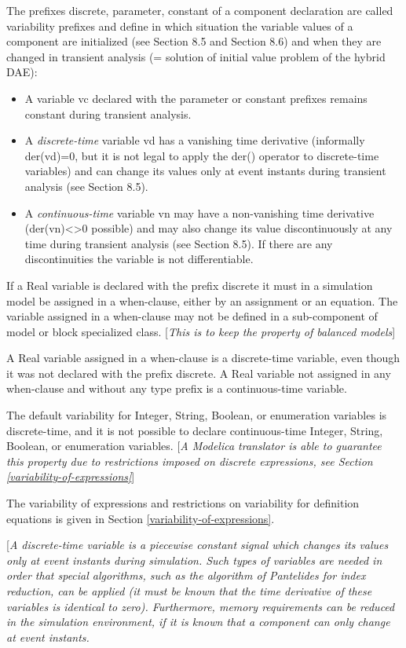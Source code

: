 \documentclass[10pt,a4paper]{report}
\def\Mcomment#1{{[}\emph{#1}{]}}
\def\Mcommentbegin#1{{[}\emph{#1}}
\begin{document}
The prefixes discrete, parameter, constant of a component declaration
are called variability prefixes and define in which situation the
variable values of a component are initialized (see Section 8.5 and
Section 8.6) and when they are changed in transient analysis (=
solution of initial value problem of the hybrid DAE):

\begin{itemize}
\item
  A variable vc declared with the parameter or constant prefixes remains
  constant during transient analysis.
\item
  A \emph{discrete-time} variable vd has a vanishing time derivative
  (informally der(vd)=0, but it is not legal to apply the der() operator
  to discrete-time variables) and can change its values only at event
  instants during transient analysis (see Section 8.5).
\item
  A \emph{continuous-time} variable vn may have a non-vanishing time
  derivative (der(vn)\textless{}\textgreater{}0 possible) and may also
  change its value discontinuously at any time during transient analysis
  (see Section 8.5). If there are any discontinuities the variable is
  not differentiable.
\end{itemize}

If a Real variable is declared with the prefix discrete it must in a
simulation model be assigned in a when-clause, either by an assignment
or an equation. The variable assigned in a when-clause may not be
defined in a sub-component of model or block specialized class.
\Mcomment{This is to keep the property of balanced models}

A Real variable assigned in a when-clause is a discrete-time variable,
even though it was not declared with the prefix discrete. A Real
variable not assigned in any when-clause and without any type prefix is
a continuous-time variable.

The default variability for Integer, String, Boolean, or enumeration
variables is discrete-time, and it is not possible to declare
continuous-time Integer, String, Boolean, or enumeration variables.
\Mcomment{A Modelica translator is able to guarantee this property due to
restrictions imposed on discrete expressions, see Section \ref{variability-of-expressions}}

The variability of expressions and restrictions on variability for
definition equations is given in Section \ref{variability-of-expressions}.

\Mcommentbegin{A discrete-time variable is a piecewise constant signal which
changes its values only at event instants during simulation. Such types
of variables are needed in order that special algorithms, such as the
algorithm of Pantelides for index reduction, can be applied (it must be
known that the time derivative of these variables is identical to zero).
Furthermore, memory requirements can be reduced in the simulation
environment, if it is known that a component can only change at event
instants. }
\end{document}
